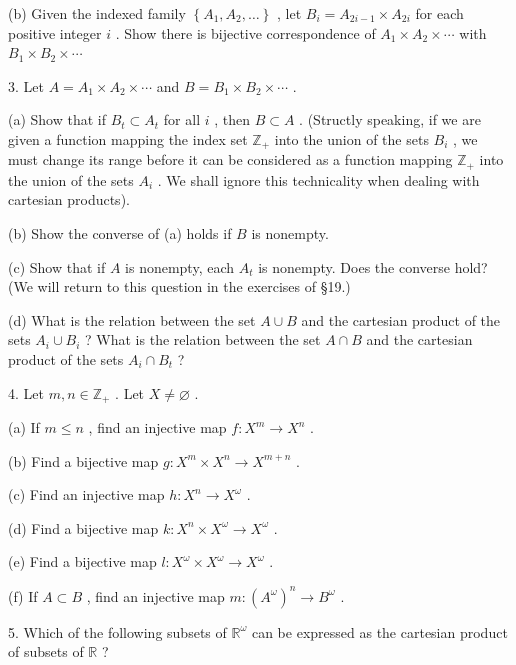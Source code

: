 \documentclass[10pt]{article}
\begin{document}
(b) Given the indexed family \(\left\{  {{A}_{1},{A}_{2},\ldots }\right\}\) , let \({B}_{i} = {A}_{{2i} - 1} \times  {A}_{2i}\) for each positive integer \(i\) . Show there is bijective correspondence of \({A}_{1} \times  {A}_{2} \times  \cdots\) with \({B}_{1} \times  {B}_{2} \times  \cdots\)

3. Let \(A = {A}_{1} \times  {A}_{2} \times  \cdots\) and \(B = {B}_{1} \times  {B}_{2} \times  \cdots\) .

(a) Show that if \({B}_{t} \subset  {A}_{t}\) for all \(i\) , then \(B \subset  A\) . (Structly speaking, if we are given a function mapping the index set \({\mathbb{Z}}_{ + }\) into the union of the sets \({B}_{i}\) , we must change its range before it can be considered as a function mapping \({\mathbb{Z}}_{ + }\) into the union of the sets \({A}_{i}\) . We shall ignore this technicality when dealing with cartesian products).

(b) Show the converse of (a) holds if \(B\) is nonempty.

(c) Show that if \(A\) is nonempty, each \({A}_{t}\) is nonempty. Does the converse hold? (We will return to this question in the exercises of §19.)

(d) What is the relation between the set \(A \cup  B\) and the cartesian product of the sets \({A}_{i} \cup  {B}_{i}\) ? What is the relation between the set \(A \cap  B\) and the cartesian product of the sets \({A}_{i} \cap  {B}_{t}\) ?

4. Let \(m,n \in  {\mathbb{Z}}_{ + }\) . Let \(X \neq  \varnothing\) .

(a) If \(m \leq  n\) , find an injective map \(f : {X}^{m} \rightarrow  {X}^{n}\) .

(b) Find a bijective map \(g : {X}^{m} \times  {X}^{n} \rightarrow  {X}^{m + n}\) .

(c) Find an injective map \(h : {X}^{n} \rightarrow  {X}^{\omega }\) .

(d) Find a bijective map \(k : {X}^{n} \times  {X}^{\omega } \rightarrow  {X}^{\omega }\) .

(e) Find a bijective map \(l : {X}^{\omega } \times  {X}^{\omega } \rightarrow  {X}^{\omega }\) .

(f) If \(A \subset  B\) , find an injective map \(m : {\left( {A}^{\omega }\right) }^{n} \rightarrow  {B}^{\omega }\) .

5. Which of the following subsets of \({\mathbb{R}}^{\omega }\) can be expressed as the cartesian product of subsets of \(\mathbb{R}\) ?
\end{document}
